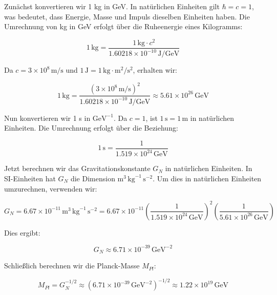 Zunächst konvertieren wir 1 kg in GeV. In natürlichen Einheiten gilt $\hbar = c = 1$, was bedeutet, dass Energie, Masse und Impuls dieselben Einheiten haben. Die Umrechnung von kg in GeV erfolgt über die Ruheenergie eines Kilogramms:

\[
1 \, \text{kg} = \frac{1 \, \text{kg} \cdot c^2}{1.60218 \times 10^{-10} \, \text{J/GeV}}
\]

Da $c = 3 \times 10^8 \, \text{m/s}$ und $1 \, \text{J} = 1 \, \text{kg} \cdot \text{m}^2/\text{s}^2$, erhalten wir:

\[
1 \, \text{kg} = \frac{(3 \times 10^8 \, \text{m/s})^2}{1.60218 \times 10^{-10} \, \text{J/GeV}} \approx 5.61 \times 10^{26} \, \text{GeV}
\]

Nun konvertieren wir 1 s in $\mathrm{GeV}^{-1}$. Da $c = 1$, ist $1 \, \text{s} = 1 \, \text{m}$ in natürlichen Einheiten. Die Umrechnung erfolgt über die Beziehung:

\[
1 \, \text{s} = \frac{1}{1.519 \times 10^{24} \, \text{GeV}}
\]

Jetzt berechnen wir das Gravitationskonstante $G_N$ in natürlichen Einheiten. In SI-Einheiten hat $G_N$ die Dimension $\mathrm{m}^3 \, \mathrm{kg}^{-1} \, \mathrm{s}^{-2}$. Um dies in natürlichen Einheiten umzurechnen, verwenden wir:

\[
G_N = 6.67 \times 10^{-11} \, \mathrm{m}^3 \, \mathrm{kg}^{-1} \, \mathrm{s}^{-2} = 6.67 \times 10^{-11} \left( \frac{1}{1.519 \times 10^{24} \, \text{GeV}} \right)^2 \left( \frac{1}{5.61 \times 10^{26} \, \text{GeV}} \right)
\]

Dies ergibt:

\[
G_N \approx 6.71 \times 10^{-39} \, \text{GeV}^{-2}
\]

Schließlich berechnen wir die Planck-Masse $M_{Pl}$:

\[
M_{Pl} = G_N^{-1/2} \approx (6.71 \times 10^{-39} \, \text{GeV}^{-2})^{-1/2} \approx 1.22 \times 10^{19} \, \text{GeV}
\]